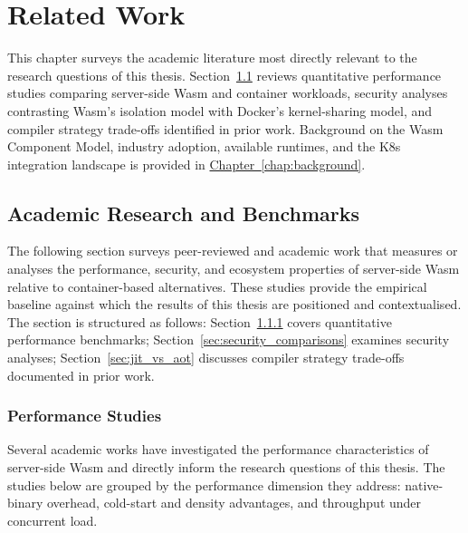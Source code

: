 \chapter{Related Work}
\label{chap:state_of_the_art}

This chapter surveys the academic literature most directly relevant to the research questions of this thesis. Section~\ref{sec:academic_research} reviews quantitative performance studies comparing server-side \acs{Wasm} and container workloads, security analyses contrasting \acs{Wasm}'s isolation model with Docker's kernel-sharing model, and compiler strategy trade-offs identified in prior work. Background on the \acs{Wasm} Component Model, industry adoption, available runtimes, and the \acs{K8s} integration landscape is provided in \hyperref[chap:background]{Chapter~\ref{chap:background}}.

\section{Academic Research and Benchmarks}
\label{sec:academic_research}

The following section surveys peer-reviewed and academic work that measures or analyses the performance, security, and ecosystem properties of server-side \acs{Wasm} relative to container-based alternatives. These studies provide the empirical baseline against which the results of this thesis are positioned and contextualised. The section is structured as follows: Section~\ref{sec:performance_studies} covers quantitative performance benchmarks; Section~\ref{sec:security_comparisons} examines security analyses; Section~\ref{sec:jit_vs_aot} discusses compiler strategy trade-offs documented in prior work.

\subsection{Performance Studies}
\label{sec:performance_studies}

Several academic works have investigated the performance characteristics of server-side \acs{Wasm} and directly inform the research questions of this thesis. The studies below are grouped by the performance dimension they address: native-binary overhead, cold-start and density advantages, and throughput under concurrent load.

